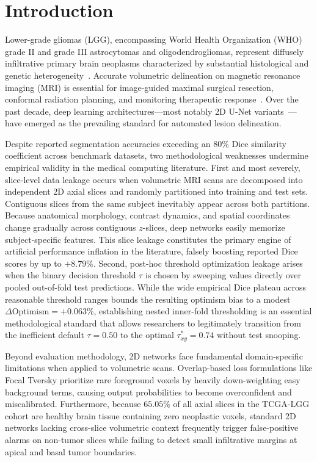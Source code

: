 \documentclass[preprint,3p,times,onecolumn]{elsarticle}
\begin{document}
\clearpage

\section{Introduction}
\label{sec:intro}

Lower-grade gliomas (LGG), encompassing World Health Organization (WHO) grade II and grade III astrocytomas and oligodendrogliomas, represent diffusely infiltrative primary brain neoplasms characterized by substantial histological and genetic heterogeneity~\cite{louis20212021,ceccarelli2016molecular}. Accurate volumetric delineation on magnetic resonance imaging (MRI) is essential for image-guided maximal surgical resection, conformal radiation planning, and monitoring therapeutic response~\cite{buda2019association}. Over the past decade, deep learning architectures---most notably 2D U-Net variants~\cite{ronneberger2015u,zhou2018unetplusplus,oktay2018attention}---have emerged as the prevailing standard for automated lesion delineation. 

Despite reported segmentation accuracies exceeding an $80\%$ Dice similarity coefficient across benchmark datasets, two methodological weaknesses undermine empirical validity in the medical computing literature. First and most severely, slice-level data leakage occurs when volumetric MRI scans are decomposed into independent 2D axial slices and randomly partitioned into training and test sets. Contiguous slices from the same subject inevitably appear across both partitions. Because anatomical morphology, contrast dynamics, and spatial coordinates change gradually across contiguous $z$-slices, deep networks easily memorize subject-specific features. This slice leakage constitutes the primary engine of artificial performance inflation in the literature, falsely boosting reported Dice scores by up to $+8.79\%$. Second, post-hoc threshold optimization leakage arises when the binary decision threshold $\tau$ is chosen by sweeping values directly over pooled out-of-fold test predictions. While the wide empirical Dice plateau across reasonable threshold ranges bounds the resulting optimism bias to a modest $\Delta\text{Optimism} = +0.063\%$, establishing nested inner-fold thresholding is an essential methodological standard that allows researchers to legitimately transition from the inefficient default $\tau=0.50$ to the optimal $\tau_{xy}^* = 0.74$ without test snooping.

Beyond evaluation methodology, 2D networks face fundamental domain-specific limitations when applied to volumetric scans. Overlap-based loss formulations like Focal Tversky prioritize rare foreground voxels by heavily down-weighting easy background terms, causing output probabilities to become overconfident and miscalibrated. Furthermore, because $65.05\%$ of all axial slices in the TCGA-LGG cohort are healthy brain tissue containing zero neoplastic voxels, standard 2D networks lacking cross-slice volumetric context frequently trigger false-positive alarms on non-tumor slices while failing to detect small infiltrative margins at apical and basal tumor boundaries.
\end{document}
